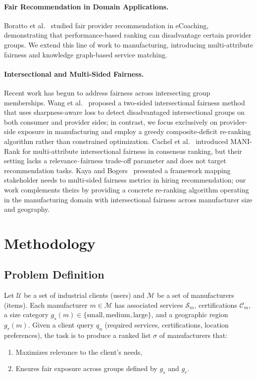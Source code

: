 \documentclass[sigconf,natbib=true]{acmart}
\begin{document}
\paragraph{Fair Recommendation in Domain Applications.}
Boratto et al.~\cite{boratto2022fair} studied fair provider recommendation in eCoaching, demonstrating that performance-based ranking can disadvantage certain provider groups. We extend this line of work to manufacturing, introducing multi-attribute fairness and knowledge graph-based service matching.

\paragraph{Intersectional and Multi-Sided Fairness.}
Recent work has begun to address fairness across intersecting group memberships. Wang et al.~\cite{wang2024intersectional} proposed a two-sided intersectional fairness method that uses sharpness-aware loss to detect disadvantaged intersectional groups on both consumer and provider sides; in contrast, we focus exclusively on provider-side exposure in manufacturing and employ a greedy composite-deficit re-ranking algorithm rather than constrained optimization. Cachel et al.~\cite{cachel2022manirank} introduced MANI-Rank for multi-attribute intersectional fairness in consensus ranking, but their setting lacks a relevance--fairness trade-off parameter and does not target recommendation tasks. Kaya and Bogers~\cite{kaya2025mapping} presented a framework mapping stakeholder needs to multi-sided fairness metrics in hiring recommendation; our work complements theirs by providing a concrete re-ranking algorithm operating in the manufacturing domain with intersectional fairness across manufacturer size and geography.

\section{Methodology}
\label{sec:method}

\subsection{Problem Definition}

Let $\mathcal{U}$ be a set of industrial clients (users) and $\mathcal{M}$ be a set of manufacturers (items). Each manufacturer $m \in \mathcal{M}$ has associated services $\mathcal{S}_m$, certifications $\mathcal{C}_m$, a size category $g_s(m) \in \{\text{small}, \text{medium}, \text{large}\}$, and a geographic region $g_r(m)$. Given a client query $q_u$ (required services, certifications, location preferences), the task is to produce a ranked list $\sigma$ of manufacturers that:
\begin{enumerate}
    \item Maximizes relevance to the client's needs,
    \item Ensures fair exposure across groups defined by $g_s$ and $g_r$.
\end{enumerate}
\end{document}
